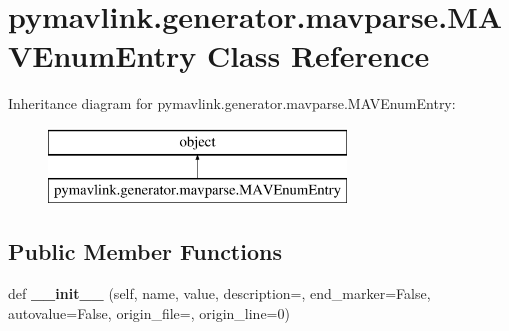 \hypertarget{classpymavlink_1_1generator_1_1mavparse_1_1MAVEnumEntry}{}\section{pymavlink.\+generator.\+mavparse.\+M\+A\+V\+Enum\+Entry Class Reference}
\label{classpymavlink_1_1generator_1_1mavparse_1_1MAVEnumEntry}
Inheritance diagram for pymavlink.\+generator.\+mavparse.\+M\+A\+V\+Enum\+Entry\+:\begin{figure}[H]
\begin{center}
\leavevmode
\includegraphics[height=2.000000cm]{classpymavlink_1_1generator_1_1mavparse_1_1MAVEnumEntry}
\end{center}
\end{figure}
\subsection*{Public Member Functions}
\begin{DoxyCompactItemize}
\item 
\mbox{\label{classpymavlink_1_1generator_1_1mavparse_1_1MAVEnumEntry_af04252e1c346345682e28d8e0151b296}} 
def {\bfseries \+\_\+\+\_\+init\+\_\+\+\_\+} (self, name, value, description=\textquotesingle{}\textquotesingle{}, end\+\_\+marker=False, autovalue=False, origin\+\_\+file=\textquotesingle{}\textquotesingle{}, origin\+\_\+line=0)
\end{DoxyCompactItemize}
